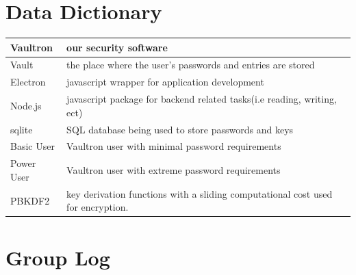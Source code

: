 \documentclass[11pt]{report}
\begin{document}
\begin{appendices}
    \chapter{Data Dictionary}

    \tabulinesep=1.2mm
    \begin{tabu} to 0.97\textwidth { | X[l] | X[l] | }
        \hline
        Vaultron & our security software  \\
        \hline
        Vault & the place where the user's passwords and entries are stored  \\
        \hline
        Electron  & javascript wrapper for application development  \\
        \hline
        Node.js  & javascript package for backend related tasks(i.e reading, writing, ect) \\
        \hline
        sqlite  & SQL database being used to store passwords and keys\\
        \hline
        Basic User  & Vaultron user with minimal password requirements \\
        \hline
        Power User  & Vaultron user with extreme password requirements \\
        \hline
        PBKDF2 &  key derivation functions with a sliding computational cost used for encryption. \\
        \hline
    \end{tabu}


    \chapter{Group Log}
\end{appendices}
\end{document}
